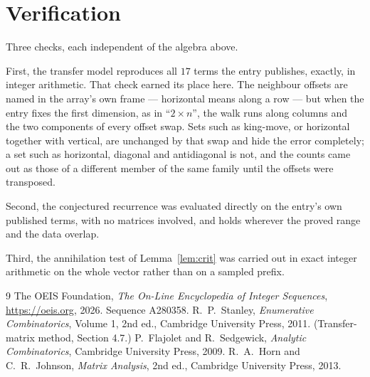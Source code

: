 \documentclass[11pt,a4paper]{article}
\theoremstyle{plain}
\theoremstyle{definition}
\begin{document}
\section{Verification}

Three checks, each independent of the algebra above.

First, the transfer model reproduces all $17$ terms the entry publishes, exactly, in
integer arithmetic. That check earned its place here. The neighbour offsets are named in the
array's own frame --- horizontal means along a row --- but when the entry fixes the first
dimension, as in ``$2\times n$'', the walk runs along columns and the two components of every
offset swap. Sets such as king-move, or horizontal together with vertical, are unchanged by
that swap and hide the error completely; a set such as horizontal, diagonal and antidiagonal
is not, and the counts came out as those of a different member of the same family until the
offsets were transposed.

Second, the conjectured recurrence was evaluated directly on the entry's own published terms,
with no matrices involved, and holds wherever the proved range and the data overlap.

Third, the annihilation test of Lemma~\ref{lem:crit} was carried out in exact integer
arithmetic on the whole vector rather than on a sampled prefix.

\begin{thebibliography}{9}
 The OEIS Foundation, \emph{The On-Line Encyclopedia of Integer
Sequences}, \url{https://oeis.org}, 2026. Sequence A280358.
 R.~P.~Stanley, \emph{Enumerative Combinatorics}, Volume 1, 2nd ed.,
Cambridge University Press, 2011. (Transfer-matrix method, Section 4.7.)
 P.~Flajolet and R.~Sedgewick, \emph{Analytic Combinatorics}, Cambridge
University Press, 2009.
 R.~A.~Horn and C.~R.~Johnson, \emph{Matrix Analysis}, 2nd ed., Cambridge
University Press, 2013.
\end{thebibliography}
\end{document}
